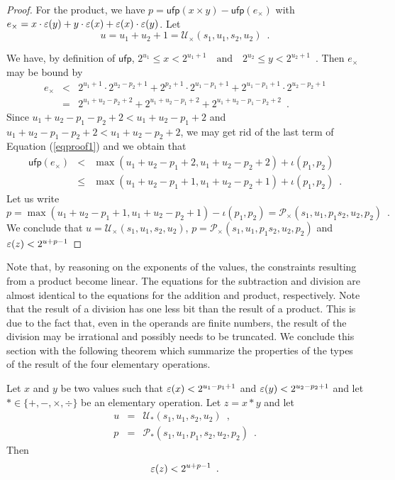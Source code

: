 \begin{proof}
For the product, we have
$p	= \mathsf{ufp}(x\times y)-\mathsf{ufp}(e_\times)$ with $e_\times=x\cdot \varepsilon(y)+y\cdot \varepsilon(x)+\varepsilon(x)\cdot\varepsilon(y)$. 
Let
$$
u=u_1+u_2+1=\mathcal{U}_\times (s_1,u_1,s_2,u_2)\enspace .
$$

We have, by definition of $\mathsf{ufp}$,
$
2^{u_1} \le x < 2^{u_1+1}\quad\text{and}\quad 2^{u_2} \le y< 2^{u_2+1}\enspace.
$
Then $e_\times$ may be bound by
\begin{equation}\label{eqproof1}
\begin{array}{rcl}
e_\times &<& 2^{u_1+1}\cdot 2^{u_2-p_2+1} + 2^{p_2+1}\cdot 2^{u_1-p_1+1}+ 2^{u_1-p_1+1}\cdot 2^{u_2-p_2+1}\\
            &=& 2^{u_1+u_2-p_2+2}+ 2^{u_1+u_2-p_1+2}+ 2^{u_1+u_2-p_1-p_2+2} \enspace.
\end{array}
\end{equation}
Since $u_1+u_2-p_1-p_2+2< u_1+u_2-p_1+2$ and $u_1+u_2-p_1-p_2+2< u_1+u_2-p_2+2$, 
we may get rid of the last term of Equation (\ref{eqproof1}) and we
obtain that
$$
\begin{array}{rcl}
\mathsf{ufp}(e_\times) &<& \max(u_1+u_2-p_1+2,u_1+u_2-p_2+2)+\iota(p_1,p_2)\\
&\le & \max(u_1+u_2-p_1+1,u_1+u_2-p_2+1)+\iota(p_1,p_2)\enspace.
\end{array}
$$
Let us write
\begin{equation}
p = \max(u_1+u_2-p_1+1,u_1+u_2-p_2+1)-\iota(p_1,p_2)=\mathcal{P}_\times(s_1,u_1,p_1s_2,u_2,p_2)\enspace .
\end{equation}
We conclude that
$u=\mathcal{U}_\times(s_1,u_1,s_2,u_2)$, $p=\mathcal{P}_\times(s_1,u_1,p_1s_2,u_2,p_2)$ and
$\varepsilon(z) < 2^{u+p-1}$
\end{proof}

Note that, by reasoning on the exponents of the values, the constraints resulting from a product become linear.
The equations for the subtraction and division are almost identical to the equations for the addition and product, 
respectively. Note that the result of a division has one less bit than the result of a product.
This is due to the fact that, even in the operands are finite numbers, the result of the
division may be irrational and possibly needs to be truncated.
We conclude this section with the following theorem which summarize the properties of the types
of the result of the four elementary operations.

\begin{theorem}\label{thop}
Let $x$ and $y$ be two values such that $\varepsilon(x)< 2^{u_1-p_1+1}$ and $\varepsilon(y)< 2^{u_2-p_2+1}$ and
let $\ast\in\{ +,-,\times,\div\}$ be an elementary operation.
Let $z=x\ast y$ and let
\begin{equation}
\begin{array}{rcl}
u&=&\mathcal{U}_\ast (s_1,u_1,s_2,u_2)\enspace ,\\
p&=&\mathcal{P}_\ast (s_1,u_1,p_1,s_2,u_2,p_2)\enspace .
\end{array}
\end{equation}
Then 
\begin{equation}
\varepsilon(z)<2^{u+p-1}\enspace .
\end{equation}
\end{theorem}

